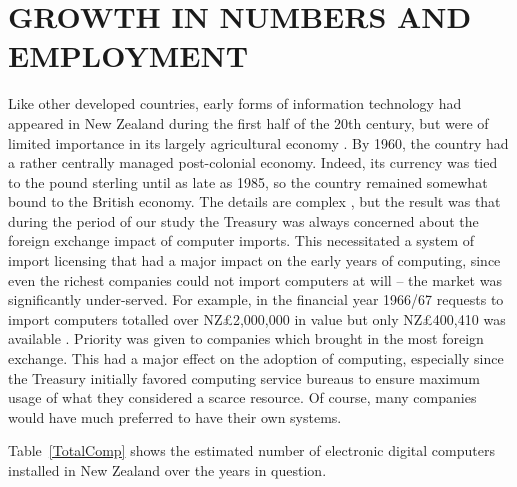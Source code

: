 \documentclass{IEEEcsmag}
\begin{document}
\section{GROWTH IN NUMBERS AND EMPLOYMENT}
Like other developed countries, early forms of information technology had appeared in New Zealand during the first half of the 20th century, but were of limited importance in its largely agricultural economy \cite{pioneers}.
By 1960, the country had a rather centrally managed post-colonial economy. Indeed, its currency was tied to the pound sterling until as late as 1985, so the country remained somewhat bound to the British economy. The details are complex \cite{Sullivan2013}, but the result was that during the period of our study the Treasury was always concerned about the foreign exchange impact of computer imports. This necessitated a
\cbstart
system of import licensing that had a major impact on the early years of computing, since even the richest companies could not import computers at will -- the market was significantly under-served.
\cbend 
For example, in the financial year 1966/67 requests to import computers totalled over NZ£2,000,000 in value but only NZ£400,410 was available \cite{Treasury-1966}. Priority was given to companies which brought in the most foreign exchange. This had a major effect on the adoption of computing, especially since the Treasury initially favored computing service bureaus to ensure maximum usage of what they considered a scarce resource. Of course, many companies would have much preferred to have their own systems.

Table~\ref{TotalComp} shows the estimated number of electronic digital computers installed in New Zealand over the years in question.
\end{document}
